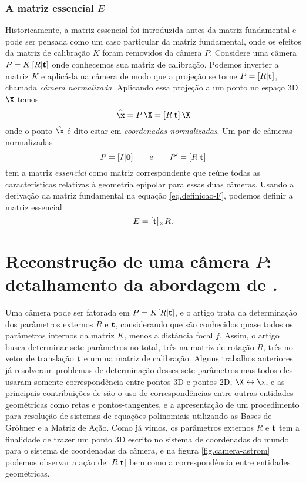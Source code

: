 \subsubsection{A matriz essencial $E$}
Historicamente, a matriz essencial foi introduzida antes da matriz fundamental e pode ser pensada como um caso particular da matriz fundamental, onde os efeitos da matriz de calibração $K$ foram removidos da câmera $P$. Considere uma câmera $P=K\,[R|{\bf t}]$ onde conhecemos sua matriz de calibração. Podemos inverter a matriz $K$ e aplicá-la na câmera de modo que a projeção se torne $P=[R|{\bf t}]$, chamada {\it câmera normalizada}. Aplicando essa projeção a um ponto no espaço 3D $\X$ temos 
\begin{equation*}
\hat{\x}=P\,\X=[R|{\bf t}]\,\X
\end{equation*}
onde o ponto $\hat{\x}$ é dito estar em {\it coordenadas  normalizadas}. Um par de câmeras normalizadas 
\begin{equation*}
P=[I|{\bf 0}]\qquad\text{e}\qquad P'=[R|{\bf t}]
\end{equation*}
tem a matriz {\it essencial} como matriz correspondente que reúne todas as características relativas à geometria epipolar para essas duas câmeras. Usando a derivação da matriz fundamental na equação \ref{eq.definicao-F}, podemos definir a matriz essencial
\begin{equation*}
E=[{\bf t}]_\times R.
\end{equation*}

\section{Reconstrução de uma câmera $P$: detalhamento da abordagem de \citep{bib:kuang}.}\label{sec.astrom}
Uma câmera pode ser fatorada em $P=K[R|{\bf t}]$, e o artigo \citep{bib:kuang} trata da determinação dos parâmetros externos $R$ e ${\bf t}$, considerando que são conhecidos quase todos os parâmetros internos da matriz $K$, menos a distância focal $f$. Assim, o artigo busca determinar sete parâmetros no total, três na matriz de rotação $R$, três no vetor de translação ${\bf t}$ e um na matriz de calibração. Alguns trabalhos anteriores já resolveram problemas de determinação desses sete parâmetros mas todos eles usaram somente correspondência entre pontos 3D e pontos 2D, $\X\leftrightarrow\x$, e as principais contribuições de \citep{bib:kuang} são o uso de correspondências entre outras entidades geométricas como retas e pontos-tangentes, e a apresentação de um procedimento para resolução de sistemas de equações polinomiais utilizando as Bases de Gr\"obner e a Matriz de Ação. Como já vimos, os parâmetros externos $R$ e ${\bf t}$ tem a finalidade de trazer um ponto 3D escrito no sistema de coordenadas do mundo para o sistema de coordenadas da câmera, e na figura \ref{fig.camera-astrom} podemos observar a ação de $[R|{\bf t}]$ bem como a correspondência entre entidades geométricas.

